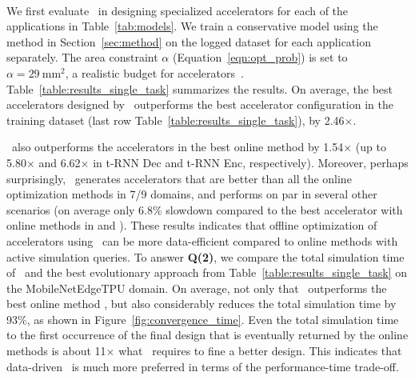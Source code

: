 ~

%
We first evaluate \primemethodname\ in designing specialized accelerators for each of the applications in Table~\ref{tab:models}.
%
We train a conservative model using the method in Section~\ref{sec:method} on the logged dataset for each application separately.
%
The area constraint $\alpha$ (Equation~\ref{eqn:opt_prob}) is set to $\alpha = 29~\text{mm}^2$, a realistic budget for accelerators~\citep{yazdanbakhsh2021apollo}. Table~\ref{table:results_single_task} summarizes the results.
%
On average, the best accelerators designed by \primemethodname\ outperforms the best accelerator configuration in the training dataset (last row Table~\ref{table:results_single_task}), by 2.46$\times$.
%
 
%
\primemethodname\ also outperforms the accelerators in the best online method by 1.54$\times$ (up to 5.80$\times$ and 6.62$\times$ in t-RNN Dec and t-RNN Enc, respectively).
%
Moreover, perhaps surprisingly, \primemethodname\ generates accelerators that are better than all the online optimization methods in 7/9 domains, and performs on par in several other scenarios (on average only 6.8$\%$ slowdown compared to the best accelerator with online methods in \mfive and \msix). 
%
These results indicates that offline optimization of accelerators using \primemethodname\ can be more data-efficient compared to online methods with active simulation queries.
%
To answer \textbf{Q(2)}, we compare the total simulation time of \primemethodname\ and the best evolutionary approach from Table~\ref{table:results_single_task} on the MobileNetEdgeTPU domain.
%
On average, not only that \primemethodname\ outperforms the best online method , but also considerably reduces the total simulation time by 93\%, as shown in Figure~\ref{fig:convergence_time}.
% 
Even the total simulation time to the first occurrence of the final design that is eventually returned by the online methods is about 11$\times$ what \primemethodname\ requires to fine a better design.
%
This indicates that data-driven \primemethodname\ is much more preferred in terms of the performance-time trade-off.  

